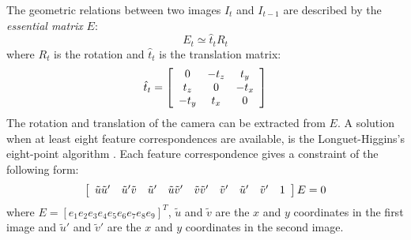 The geometric relations between two images $I_t$ and $I_{t-1}$ are described by the \textit{essential matrix} $E$:
\begin{equation}
E_t \simeq \hat{t}_t R_t
\end{equation}
where $R_t$ is the rotation and $\hat{t}_t$ is the translation matrix:
\begin{equation}
\hat{t}_t = 
\left[ \begin{array}{c c c}
0 & -t_z & t_y \\
t_z & 0 & -t_x \\
-t_y & t_x & 0
\end{array} \right]
\end{equation}
The rotation and translation of the camera can be extracted from $E$.
A solution when at least eight feature correspondences are available, is the Longuet-Higgins's eight-point algorithm \cite{longuet1987computer}.
Each feature correspondence gives a constraint of the following form:
\begin{equation}
\left[ \begin{array}{c c c c c c c c c}
\tilde{u}\tilde{u}' & \tilde{u}'\tilde{v} & \tilde{u}' & \tilde{u}\tilde{v}' & \tilde{v}\tilde{v}' & \tilde{v}' & \tilde{u}' & \tilde{v}' & 1
\end{array} \right]
E = 0
\end{equation}
where $E = [e_1  e_2  e_3  e_4  e_5  e_6  e_7  e_8  e_9]^T$, 
$\tilde{u}$ and $\tilde{v}$ are the $x$ and $y$ coordinates in the first image and $\tilde{u}'$ and $\tilde{v}'$ are the $x$ and $y$ coordinates in the second image.

